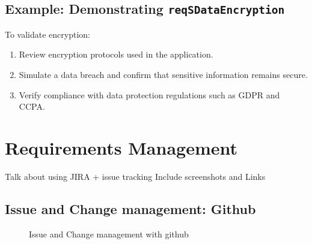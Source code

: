 \subsection{Example: Demonstrating \texttt{reqSDataEncryption} }
To validate encryption:
\begin{enumerate}
    \item Review encryption protocols used in the application.
    \item Simulate a data breach and confirm that sensitive information remains secure.
    \item Verify compliance with data protection regulations such as GDPR and CCPA.
\end{enumerate}




\section{Requirements Management}
Talk about using JIRA + issue tracking 
Include screenshots and Links 

\subsection{Issue and Change management: Github }
\begin{figure}[!h]
    \centering
    \caption{Issue and Change management with github }
    \label{fig:github}
\end{figure}